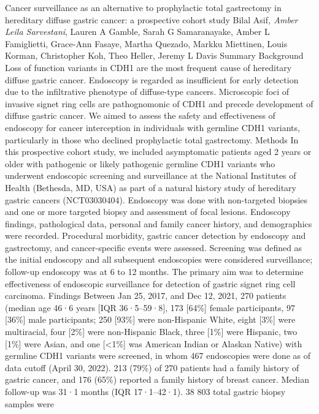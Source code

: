 \documentclass[
  letterpaper,
]{scrbook}
\begin{document}
Cancer surveillance as an alternative to prophylactic total gastrectomy
in hereditary diffuse gastric cancer: a prospective cohort study Bilal
Asif\emph{, Amber Leila Sarvestani}, Lauren A Gamble, Sarah G
Samaranayake, Amber L Famiglietti, Grace-Ann Fasaye, Martha Quezado,
Markku Miettinen, Louis Korman, Christopher Koh, Theo Heller, Jeremy L
Davis Summary Background Loss of function variants in CDH1 are the most
frequent cause of hereditary diffuse gastric cancer. Endoscopy is
regarded as insufficient for early detection due to the infiltrative
phenotype of diffuse-type cancers. Microscopic foci of invasive signet
ring cells are pathognomonic of CDH1 and precede development of diffuse
gastric cancer. We aimed to assess the safety and effectiveness of
endoscopy for cancer interception in individuals with germline CDH1
variants, particularly in those who declined prophylactic total
gastrectomy. Methods In this prospective cohort study, we included
asymptomatic patients aged 2 years or older with pathogenic or likely
pathogenic germline CDH1 variants who underwent endoscopic screening and
surveillance at the National Institutes of Health (Bethesda, MD, USA) as
part of a natural history study of hereditary gastric cancers
(NCT03030404). Endoscopy was done with non-targeted biopsies and one or
more targeted biopsy and assessment of focal lesions. Endoscopy
findings, pathological data, personal and family cancer history, and
demographics were recorded. Procedural morbidity, gastric cancer
detection by endoscopy and gastrectomy, and cancer-specific events were
assessed. Screening was defined as the initial endoscopy and all
subsequent endoscopies were considered surveillance; follow-up endoscopy
was at 6 to 12 months. The primary aim was to determine effectiveness of
endoscopic surveillance for detection of gastric signet ring cell
carcinoma. Findings Between Jan 25, 2017, and Dec 12, 2021, 270 patients
(median age 46·6 years {[}IQR 36·5--59·8{]}, 173 {[}64\%{]} female
participants, 97 {[}36\%{]} male participants; 250 {[}93\%{]} were
non-Hispanic White, eight {[}3\%{]} were multiracial, four {[}2\%{]}
were non-Hispanic Black, three {[}1\%{]} were Hispanic, two {[}1\%{]}
were Asian, and one {[}\textless1\%{]} was American Indian or Alaskan
Native) with germline CDH1 variants were screened, in whom 467
endoscopies were done as of data cutoff (April 30, 2022). 213 (79\%) of
270 patients had a family history of gastric cancer, and 176 (65\%)
reported a family history of breast cancer. Median follow-up was 31·1
months (IQR 17·1--42·1). 38 803 total gastric biopsy samples were
\end{document}
